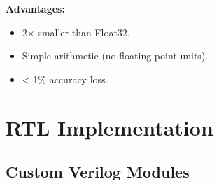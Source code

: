 \documentclass[11pt, a4paper]{article}
\begin{document}
\textbf{Advantages:}
\begin{itemize}
    \item 2$\times$ smaller than Float32.
    \item Simple arithmetic (no floating-point units).
    \item < 1\% accuracy loss.
\end{itemize}

\section{RTL Implementation}

\subsection{Custom Verilog Modules}
\end{document}
